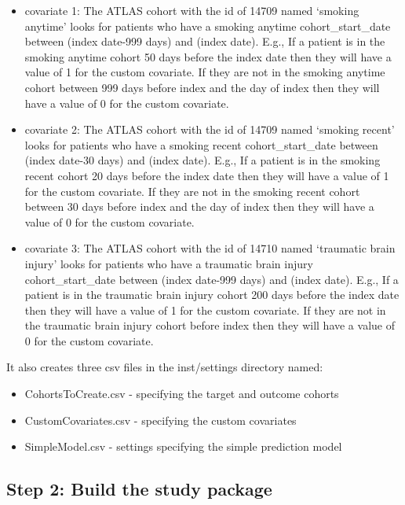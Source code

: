 \documentclass[
]{article}
\providecommand{\tightlist}{%
  \setlength{\itemsep}{0pt}\setlength{\parskip}{0pt}}
\begin{document}
\begin{itemize}
\tightlist
\item
  covariate 1: The ATLAS cohort with the id of 14709 named `smoking
  anytime' looks for patients who have a smoking anytime
  cohort\_start\_date between (index date-999 days) and (index date).
  E.g., If a patient is in the smoking anytime cohort 50 days before the
  index date then they will have a value of 1 for the custom covariate.
  If they are not in the smoking anytime cohort between 999 days before
  index and the day of index then they will have a value of 0 for the
  custom covariate.
\item
  covariate 2: The ATLAS cohort with the id of 14709 named `smoking
  recent' looks for patients who have a smoking recent
  cohort\_start\_date between (index date-30 days) and (index date).
  E.g., If a patient is in the smoking recent cohort 20 days before the
  index date then they will have a value of 1 for the custom covariate.
  If they are not in the smoking recent cohort between 30 days before
  index and the day of index then they will have a value of 0 for the
  custom covariate.
\item
  covariate 3: The ATLAS cohort with the id of 14710 named `traumatic
  brain injury' looks for patients who have a traumatic brain injury
  cohort\_start\_date between (index date-999 days) and (index date).
  E.g., If a patient is in the traumatic brain injury cohort 200 days
  before the index date then they will have a value of 1 for the custom
  covariate. If they are not in the traumatic brain injury cohort before
  index then they will have a value of 0 for the custom covariate.
\end{itemize}

It also creates three csv files in the inst/settings directory named:

\begin{itemize}
\tightlist
\item
  CohortsToCreate.csv - specifying the target and outcome cohorts
\item
  CustomCovariates.csv - specifying the custom covariates
\item
  SimpleModel.csv - settings specifying the simple prediction model
\end{itemize}

\hypertarget{step-2-build-the-study-package}{%
\subsection{Step 2: Build the study
package}\label{step-2-build-the-study-package}}
\end{document}
